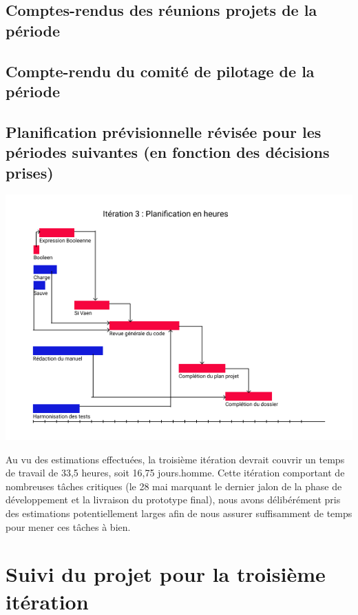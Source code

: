 \documentclass[12pt,a4paper,titlepage,openany, oneside]{report}
\begin{document}
    \subsection{Comptes-rendus des réunions projets de la période}

    \subsection{Compte-rendu du comité de pilotage de la période}

    \subsection{Planification prévisionnelle révisée pour les périodes suivantes (en fonction des décisions prises)}

    \includegraphics[scale=0.75]{fichiers/planification/iteration3/iteration3Planif.png}

    Au vu des estimations effectuées, la troisième itération devrait couvrir un temps
    de travail de 33,5 heures, soit 16,75 jours.homme. Cette itération comportant de
    nombreuses tâches critiques (le 28 mai marquant le dernier jalon de la phase de
    développement et la livraison du prototype final), nous avons délibérément pris des estimations potentiellement larges
    afin de nous assurer suffisamment de temps pour mener ces tâches à bien.

    \section{Suivi du projet pour la troisième itération}
\end{document}
